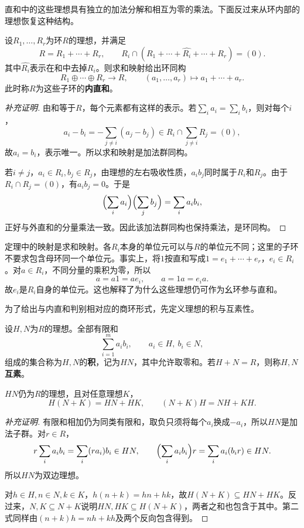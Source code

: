 直和中的这些理想具有独立的加法分解和相互为零的乘法。下面反过来从环内部的理想恢复这种结构。

\begin{theorem}\label{p2:ring-internal-sum}
设$R_1,\ldots,R_r$为环$R$的理想，并满足
\[
R=R_1+\cdots+R_r,\qquad
R_i\cap(R_1+\cdots+\widehat{R_i}+\cdots+R_r)=(0).
\]
其中$\widehat{R_i}$表示在和中去掉$R_i$。则求和映射给出环同构
\[
R_1\oplus\cdots\oplus R_r\longrightarrow R,
\qquad(a_1,\ldots,a_r)\longmapsto a_1+\cdots+a_r.
\]
此时称$R$为这些子环的\textbf{内直和}。
\end{theorem}
\begin{proof}[补充证明]
由和等于$R$，每个元素都有这样的表示。若$\sum_i a_i=\sum_i b_i$，则对每个$i$，
\[
a_i-b_i=-\sum_{j\ne i}(a_j-b_j)
\in R_i\cap\sum_{j\ne i}R_j=(0),
\]
故$a_i=b_i$，表示唯一。所以求和映射是加法群同构。

若$i\ne j$，$a_i\in R_i,b_j\in R_j$，由理想的左右吸收性质，$a_ib_j$同时属于$R_i$和$R_j$。由于$R_i\cap R_j=(0)$，有$a_ib_j=0$。于是
\[
\Bigl(\sum_i a_i\Bigr)\Bigl(\sum_j b_j\Bigr)=\sum_i a_ib_i,
\]
正好与外直和的分量乘法一致。因此该加法群同构也保持乘法，是环同构。
\end{proof}

定理中的映射是求和映射。各$R_i$本身的单位元可以与$R$的单位元不同；这里的子环不要求包含母环同一个单位元。事实上，将$1$按直和写成$1=e_1+\cdots+e_r$，$e_i\in R_i$。对$a\in R_i$，不同分量的乘积为零，所以
\[
a=a1=ae_i,\qquad a=1a=e_i a.
\]
故$e_i$是$R_i$自身的单位元。这也解释了为什么这些理想仍可作为幺环参与直和。

为了给出与内直和判别相对应的商环形式，先定义理想的积与互素性。

\begin{definition}
设$H,N$为$R$的理想。全部有限和
\[
\sum_{i=1}^m a_ib_i,\qquad a_i\in H,\ b_i\in N,
\]
组成的集合称为$H,N$的\textbf{积}，记为$HN$，其中允许取零和。若$H+N=R$，则称$H,N$\textbf{互素}。
\end{definition}
\begin{proposition}
$HN$仍为$R$的理想，且对任意理想$K$，
\[
H(N+K)=HN+HK,\qquad(N+K)H=NH+KH.
\]
\end{proposition}
\begin{proof}[补充证明]
有限和相加仍为同类有限和，取负只须将每个$a_i$换成$-a_i$，所以$HN$是加法子群。对$r\in R$，
\[
r\sum_i a_ib_i=\sum_i(ra_i)b_i\in HN,
\qquad\Bigl(\sum_i a_ib_i\Bigr)r=\sum_i a_i(b_ir)\in HN.
\]
所以$HN$为双边理想。

对$h\in H,n\in N,k\in K$，$h(n+k)=hn+hk$，故$H(N+K)\subseteq HN+HK$。反过来，$N,K\subseteq N+K$说明$HN,HK\subseteq H(N+K)$，两者之和也包含于其中。第二式同样由$(n+k)h=nh+kh$及两个反向包含得到。
\end{proof}

